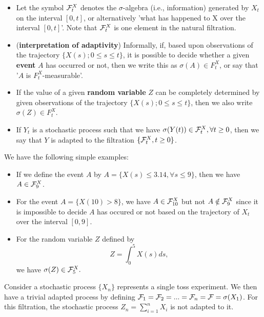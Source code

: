 \begin{refsection}
\begin{remark}\cite[43]{bjork2009arbitrage}\hfill
\begin{itemize}
	\item Let the symbol $\mathcal{F}_t^X$ denotes the $\sigma$-algebra (i.e., information) generated by $X_t$ on the interval $[0, t]$, or alternatively 'what has happened to X over the interval $[0, t]$'. Note that $\mathcal{F}_t^X$ is one element in the natural filtration.
	\item (\textbf{interpretation of adaptivity}) Informally, if, based upon observations of the trajectory $\{X(s); 0 \leq s \leq t\}$, it is possible to decide whether a given \textbf{event} $A$ has occurred or not, then we write this as $\sigma(A) \in F^X_t$, or say that '$A$ is $F_t^X$-measurable'. 
	\item If the value of a given \textbf{random variable} $Z$ can be completely determined by given observations of the trajectory $\{X(s); 0 \leq s \leq t\}$, then we also write $\sigma(Z) \in F_t^X.$
	\item If $Y_t$ is a stochastic process such that we have $\sigma(Y(t))\in \mathcal{F}_t^X, \forall t \geq 0$, then we say that $Y$ is adapted to the filtration $\{\mathcal{F}_t^X, t\geq 0\}$.
\end{itemize}	

We have the following simple examples:
\begin{itemize}
	\item If we define the event $A$ by $A = \{X(s) \leq 3.14,\forall s\leq 9\}$, then we have $A\in \mathcal{F}_9^X$.
	\item For the event $A=\{X(10) >8\}$, we have $A\in \mathcal{F}_{10}^X$ but not $A\notin \mathcal{F}_9^X$ since it is impossible to decide $A$ has occured or not based on the trajectory of $X_t$ over the interval $[0,9]$.
	\item For the random variable $Z$ defined by
	$$Z = \int_0^5 X(s)ds,$$
	we have $\sigma(Z)\in \mathcal{F}_5^X.$
\end{itemize}
\end{remark}



\begin{example}
Consider a stochastic process $\{X_n\}$ represents a single toss experiment. We then have a trivial adapted process by defining $\mathcal{F}_1 =\mathcal{F}_2 =...=\mathcal{F}_n = \mathcal{F} = \sigma(X_1)$. For this filtration, the stochastic process $Z_n=\sum_{i=1}^n X_i$ is not adapted to it.	
\end{example}


\end{refsection}

